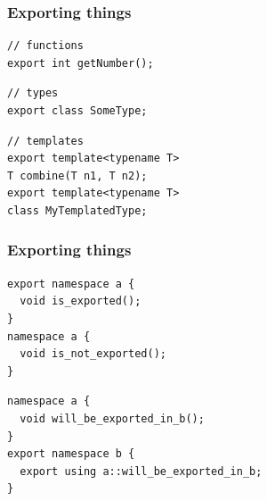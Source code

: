 \documentclass[aspectratio=169]{beamer}
\newif\iftransitions
\newcommand{\cpause}{\iftransitions \pause \fi}
\begin{document}
\begin{frame}[fragile]
  \frametitle{Exporting things}

  \begin{lstlisting}[style=cpp20]
// functions
export int getNumber();
  \end{lstlisting}
  \cpause
  \begin{lstlisting}[style=cpp20]
// types
export class SomeType;
  \end{lstlisting}
  \cpause
  \begin{lstlisting}[style=cpp20]
// templates
export template<typename T>
T combine(T n1, T n2);
export template<typename T>
class MyTemplatedType;
  \end{lstlisting}

\end{frame}

\begin{frame}[fragile]
  \frametitle{Exporting things}

  \begin{lstlisting}[style=cpp20]
export namespace a {
  void is_exported();
}
namespace a {
  void is_not_exported();
}
  \end{lstlisting}
  \cpause
  \begin{lstlisting}[style=cpp20]
namespace a {
  void will_be_exported_in_b();
}
export namespace b {
  export using a::will_be_exported_in_b;
}
  \end{lstlisting}

\end{frame}
\end{document}
